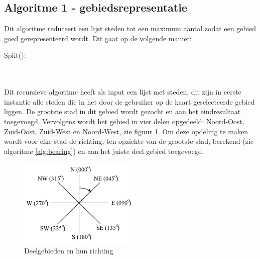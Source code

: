 \documentclass[twoside,openright]{uva-bachelor-thesis}
\begin{document}
		\subsection{Algoritme 1 - gebiedsrepresentatie}
			Dit algoritme reduceert een lijst steden tot een maximum aantal zodat een gebied goed gerepresenteerd wordt. Dit gaat op de volgende manier:
			\begin{algorithm}
				\caption{Algortime 1 voor gebiedsrepresentatie}
				\mbox{Split():}\\[0.5cm]
				\mbox{}\\
			\end{algorithm}\\[0.5cm]
			Dit recursieve algoritme heeft als input een lijst met steden, dit zijn in eerste instantie alle steden die in het door de gebruiker op de kaart geselecteerde gebied liggen. De grootste stad in dit gebied wordt gezocht en aan het eindresultaat toegevoegd. Vervolgens wordt het gebied in vier delen opgedeeld: Noord-Oost, Zuid-Oost, Zuid-West en Noord-West, zie figuur \ref{fig:bearing}. Om deze opdeling te maken wordt voor elke stad de richting, ten opzichte van de grootste stad, berekend (zie algoritme \ref{alg:bearing}) en aan het juiste deel gebied toegevoegd.
			\begin{figure}[!htb]
				\centering
				\includegraphics[scale=1.0]{./img/bearings.png}
				\caption{Deelgebieden en hun richting}
				\label{fig:bearing}
			\end{figure}
\end{document}
